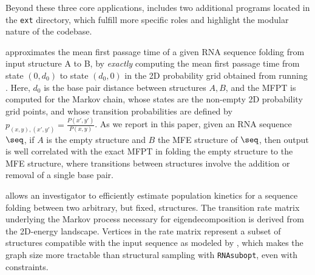 Beyond these three core applications, \Hermes includes two
additional programs located in the {\tt ext} directory, which fulfill
more specific roles and highlight the modular nature of the codebase.

\FFTmfpt approximates the mean first passage time of a given RNA
sequence folding from input structure A to B, by {\em exactly}
computing the mean first passage time from state $(0,d_0)$ to state
$(d_0,0)$ in the 2D probability grid obtained from running
\FFTborTwoD. Here, $d_0$ is the base pair distance between structures
$A,B$, and the MFPT is computed for the Markov chain, whose states are
the non-empty 2D probability grid points, and whose transition
probabilities are defined by $p_{(x,y),(x',y')} =
\frac{P(x',y')}{P(x,y)}$. As we report in this paper, given an RNA
sequence $\seq$, if $A$ is the empty structure and $B$ the MFE
structure of $\seq$, then \FFTmfpt output is well correlated with the
exact MFPT in folding the empty structure to the MFE structure, where
transitions between structures involve the addition or removal of a
single base pair.

\FFTeq allows an investigator to efficiently estimate population
kinetics for a sequence folding between two arbitrary, but fixed,
structures. The transition rate matrix underlying the Markov process
necessary for eigendecomposition is derived from the 2D-energy
landscape. Vertices in the rate matrix represent a subset of
structures compatible with the input sequence as modeled by
\FFTborTwoD, which makes the graph size more tractable than structural
sampling with {\tt RNAsubopt}, even with constraints.


